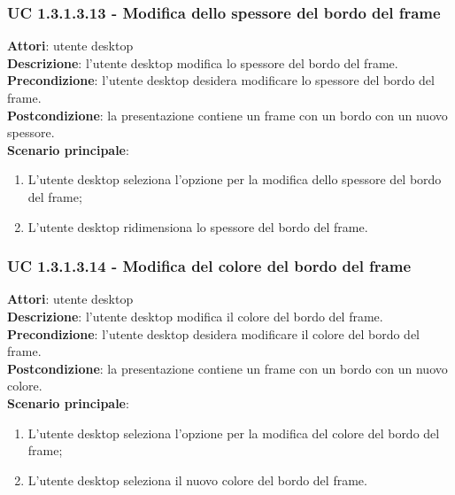 \subsubsection{UC 1.3.1.3.13 - Modifica dello spessore del bordo del frame}{
	\label{uc1.3.1.3.13}
	\textbf{Attori}: utente desktop \\
	\textbf{Descrizione}: l'utente desktop modifica lo spessore del bordo del frame. \\
	\textbf{Precondizione}: l'utente desktop desidera modificare lo spessore del bordo del frame.	\\
	\textbf{Postcondizione}: la presentazione contiene un frame con un bordo con un nuovo spessore.	\\
	\textbf{Scenario principale}:
	\begin{enumerate}
		\item L'utente desktop seleziona l'opzione per la modifica dello spessore del bordo del frame;
		\item L'utente desktop ridimensiona lo spessore del bordo del frame.
	\end{enumerate}
	}
\subsubsection{UC 1.3.1.3.14 - Modifica del colore del bordo del frame}{
	\label{uc1.3.1.3.14}
	\textbf{Attori}: utente desktop \\
	\textbf{Descrizione}: l'utente desktop modifica il colore del bordo del frame. \\
	\textbf{Precondizione}: l'utente desktop desidera modificare il colore del bordo del frame.	\\
	\textbf{Postcondizione}: la presentazione contiene un frame con un bordo con un nuovo colore.	\\
	\textbf{Scenario principale}:
	\begin{enumerate}
		\item L'utente desktop seleziona l'opzione per la modifica del colore del bordo del frame;
		\item L'utente desktop seleziona il nuovo colore del bordo del frame.
	\end{enumerate}
	}
